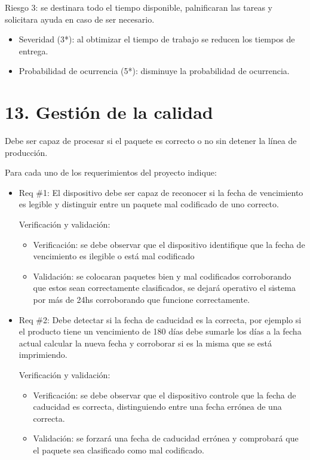 \documentclass[11pt]{charter}
\begin{document}
Riesgo 3: se destinara todo el tiempo disponible, palnificaran las tareas y solicitara ayuda en caso de ser necesario.

\begin{itemize}
\item Severidad (3*): al obtimizar el tiempo de trabajo se reducen los tiempos de entrega.
\item Probabilidad de ocurrencia (5*): disminuye la probabilidad de ocurrencia.
\end{itemize}

\section{13. Gestión de la calidad}
\label{sec:calidad}




Debe ser capaz de procesar si el paquete es correcto o no sin detener la línea de producción.


Para cada uno de los requerimientos del proyecto indique:
\begin{itemize} 
\item Req \#1: El dispositivo debe ser capaz de reconocer si la fecha de vencimiento es legible y distinguir entre un paquete mal codificado de uno correcto.

Verificación y validación:

\begin{itemize}
\item Verificación: se debe observar que el dispositivo identifique que la fecha de vencimiento es ilegible o está mal codificado 
\item Validación: se colocaran paquetes bien y mal codificados corroborando que estos sean correctamente clasificados, se dejará operativo el sistema por más de 24hs corroborando que funcione correctamente.

\end{itemize}

\end{itemize}

\begin{itemize} 
\item Req \#2: Debe detectar si la fecha de caducidad es la correcta, por ejemplo si el producto tiene un vencimiento de 180 días debe sumarle los días a la fecha actual calcular la nueva fecha y corroborar si es la misma que se está imprimiendo. 

Verificación y validación:

\begin{itemize}
\item Verificación: se debe observar que el dispositivo controle que la fecha de caducidad es correcta, distinguiendo entre una fecha errónea de una correcta.
\item Validación: se forzará una fecha de caducidad errónea y comprobará que el paquete sea clasificado como mal codificado.

\end{itemize}

\end{itemize}
\end{document}
